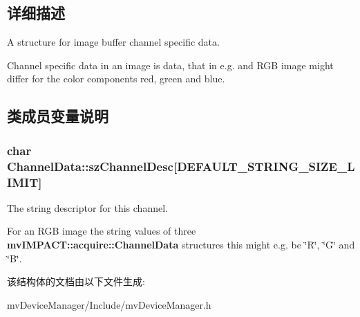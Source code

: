 \subsection{详细描述}
A structure for image buffer channel specific data. 

Channel specific data in an image is data, that in e.\+g. and R\+G\+B image might differ for the color components red, green and blue. 

\subsection{类成员变量说明}
\hypertarget{struct_channel_data_ad67b0964b56b1af796428b3fe3f2f735}{
\subsubsection[{sz\+Channel\+Desc}]{\setlength{\rightskip}{0pt plus 5cm}char Channel\+Data\+::sz\+Channel\+Desc\mbox{[}D\+E\+F\+A\+U\+L\+T\+\_\+\+S\+T\+R\+I\+N\+G\+\_\+\+S\+I\+Z\+E\+\_\+\+L\+I\+M\+I\+T\mbox{]}}}\label{struct_channel_data_ad67b0964b56b1af796428b3fe3f2f735}


The string descriptor for this channel. 

For an R\+G\+B image the string values of three {\bfseries mv\+I\+M\+P\+A\+C\+T\+::acquire\+::\+Channel\+Data} structures this might e.\+g. be \char`\"{}\+R\char`\"{}, \char`\"{}\+G\char`\"{} and \char`\"{}\+B\char`\"{}. 

该结构体的文档由以下文件生成\+:\begin{DoxyCompactItemize}
\item 
mv\+Device\+Manager/\+Include/mv\+Device\+Manager.\+h\end{DoxyCompactItemize}
